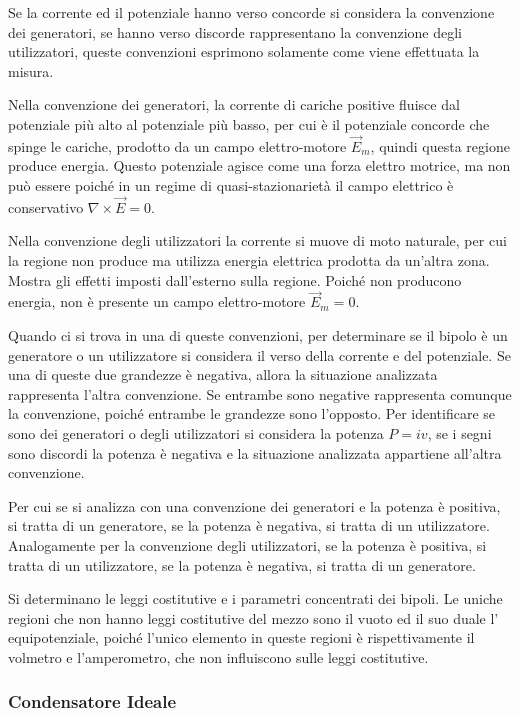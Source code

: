 \documentclass{article}
\numberwithin{equation}{subsection}
\begin{document}
Se la corrente ed il potenziale hanno verso concorde si considera la convenzione dei generatori, se hanno verso discorde rappresentano la convenzione degli utilizzatori, 
queste convenzioni esprimono solamente come viene effettuata la misura. 


Nella convenzione dei generatori, la corrente di cariche positive fluisce dal potenziale più alto al potenziale più basso, per cui è il potenziale concorde che spinge le 
cariche, prodotto da un campo elettro-motore $\vec{E}_m$, quindi questa regione produce energia. Questo potenziale agisce come una forza elettro motrice, ma non può essere 
poiché in un regime di quasi-stazionarietà il campo elettrico è conservativo $\nabla\times\vec{E}=0$. 


Nella convenzione degli utilizzatori la corrente si muove di moto naturale, per cui la regione non produce ma utilizza energia elettrica prodotta da un'altra zona. Mostra 
gli effetti imposti dall'esterno sulla regione. Poiché non producono energia, non è presente un campo elettro-motore $\vec{E}_m=0$. 


Quando ci si trova in una di queste convenzioni, per determinare se il bipolo è un generatore o un utilizzatore si considera il verso della corrente e del potenziale. Se una 
di queste due grandezze è negativa, allora la situazione analizzata rappresenta l'altra convenzione. Se entrambe sono negative rappresenta comunque la convenzione, poiché 
entrambe le grandezze sono l'opposto. Per identificare se sono dei generatori o degli utilizzatori si considera la potenza $P=iv$, se i segni sono discordi la potenza è negativa 
e la situazione analizzata appartiene all'altra convenzione. 

Per cui se si analizza con una convenzione dei generatori e la potenza è positiva, si tratta di un generatore, se la potenza è negativa, si tratta di un utilizzatore. 
Analogamente per la convenzione degli utilizzatori, se la potenza è positiva, si tratta di un utilizzatore, se la potenza è negativa, si tratta di un generatore. 



Si determinano le leggi costitutive e i parametri concentrati dei bipoli. Le uniche regioni che non hanno leggi costitutive del mezzo sono il vuoto ed il suo duale l'
equipotenziale, poiché l'unico elemento in queste regioni è rispettivamente il volmetro e l'amperometro, che non influiscono sulle leggi costitutive. 

\subsubsection{Condensatore Ideale}
\end{document}
